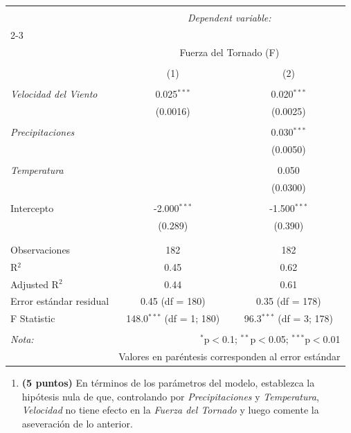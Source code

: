 \documentclass[10pt,a4paper]{article}
\begin{document}
\begin{enumerate}
\begin{table}[H] \centering 
  \label{tab:tornado_reg} 
\begin{tabular}{@{\extracolsep{5pt}}lcc} 
\\[-1.8ex]\hline 
\hline \\[-1.8ex] 
 & \multicolumn{2}{c}{\textit{Dependent variable:}} \\ 
\cline{2-3} 
\\[-1.8ex] & \multicolumn{2}{c}{Fuerza del Tornado (F)} \\ 
\\[-1.8ex] & (1) & (2) \\ 
\hline \\[-1.8ex] 
 \textit{Velocidad del Viento} & 0.025$^{***}$ & 0.020$^{***}$ \\ 
  & (0.0016) & (0.0025) \\ 
  & & \\ 
 \textit{Precipitaciones} &  & 0.030$^{***}$ \\ 
  &  & (0.0050) \\ 
  & & \\ 
 \textit{Temperatura} &  & 0.050 \\ 
  &  & (0.0300) \\ 
  & & \\ 
 Intercepto & -2.000$^{***}$ & -1.500$^{***}$ \\ 
  & (0.289) & (0.390) \\ 
  & & \\ 
\hline \\[-1.8ex] 
Observaciones & 182 & 182 \\ 
R$^{2}$ & 0.45 & 0.62 \\ 
Adjusted R$^{2}$ & 0.44 & 0.61 \\ 
Error estándar residual & 0.45 (df = 180) & 0.35 (df = 178) \\ 
F Statistic & 148.0$^{***}$ (df = 1; 180) & 96.3$^{***}$ (df = 3; 178) \\ 
\hline 
\hline \\[-1.8ex] 
\textit{Nota:}  & \multicolumn{2}{r}{$^{*}$p$<$0.1; $^{**}$p$<$0.05; $^{***}$p$<$0.01} \\
\textit{}  & \multicolumn{2}{r}{Valores en paréntesis corresponden al error estándar}
\end{tabular} 
\end{table}  

\begin{enumerate}
    \item \textbf{(5 puntos)} En términos de los parámetros del modelo, establezca la hipótesis nula de que, controlando por \textit{Precipitaciones} y \textit{Temperatura}, \textit{Velocidad} no tiene efecto en la \textit{Fuerza del Tornado} y luego comente la aseveración de lo anterior.
    

\end{enumerate}
\end{enumerate}
\end{document}
